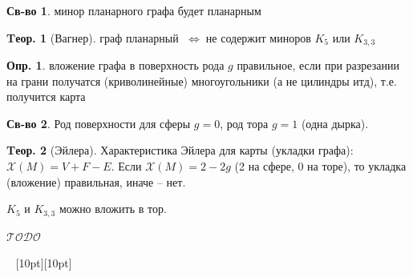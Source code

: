 \documentclass[a4paper,12pt]{article}
\theoremstyle{definition}
\newtheorem{definition}{Опр.}[section]
\newtheorem*{property}{Св-во}  %
\theoremstyle{definition}
\newtheorem{theorem}{Tеор.}[section]
\def\iiff{$\;\Longleftrightarrow\;$}
\def\iiChi{\mathcal{X}}
\def\iiTODO{\guillemotleft$\mathcal{TODO}$\guillemotright\textellipsis}
\begin{document}
\begin{property}
	минор планарного графа будет планарным
\end{property}

\begin{theorem}[Вагнер]
	граф планарный \iiff не содержит миноров $K_5$ или $K_{3,3}$
\end{theorem}

\begin{definition}
	вложение графа в поверхность рода $g$ правильное, если при разрезании на грани получатся (криволинейные) многоугольники (а не цилиндры итд), т.е. получится карта
\end{definition}

\begin{property}
	Род поверхности для сферы $g=0$, род тора $g=1$ (одна дырка).
\end{property}

\begin{theorem}[Эйлера]
	Характеристика Эйлера для карты (укладки графа): $\iiChi(M) = V+F-E$.
	Если $\iiChi(M) = 2-2g$ (2 на сфере, 0 на торе), то укладка (вложение) правильная, иначе -- нет. 
\end{theorem}

$K_5$ и $K_{3,3}$ можно вложить в тор.

\iiTODO



\vspace{48pt} \noindent \hrulefill~ \raisebox{-8pt}[10pt][10pt]{\Huge{}}~ \hrulefill
\end{document}
